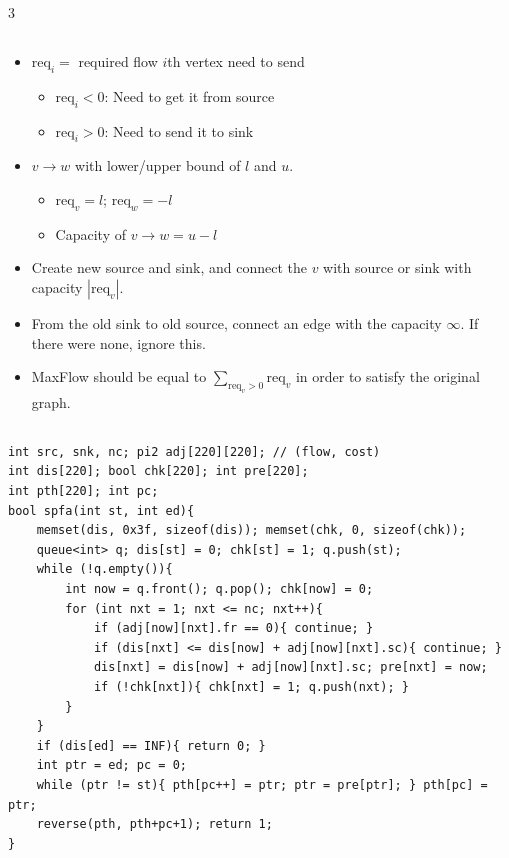 \documentclass[landscape, 8pt, a4paper, oneside]{extarticle}
\begin{document}
\begin{multicols*}{3}
\subsection{}
\begin{itemize}
	\item $\mathrm{req}_i = $ required flow $i$th vertex need to send
	\begin{itemize}
		\item $\mathrm{req}_i < 0$: Need to get it from source
		\item $\mathrm{req}_i > 0$: Need to send it to sink
	\end{itemize}
	\item $v \rightarrow w$ with lower/upper bound of $l$ and $u$.
	\begin{itemize}
		\item $\mathrm{req}_v = l$; $\mathrm{req}_w = -l$
		\item Capacity of $v \rightarrow w = u-l$
	\end{itemize}
	\item Create new source and sink, and connect the $v$ with source or sink with capacity $|\mathrm{req}_v|$.
	\item From the old sink to old source, connect an edge with the capacity $\infty$. If there were none, ignore this.
	\item MaxFlow should be equal to $\sum\limits_{\mathrm{req}_v > 0} \mathrm{req}_v$ in order to satisfy the original graph.
\end{itemize}
\subsection{}
\begin{verbatim}
int src, snk, nc; pi2 adj[220][220]; // (flow, cost)
int dis[220]; bool chk[220]; int pre[220];
int pth[220]; int pc;
bool spfa(int st, int ed){
	memset(dis, 0x3f, sizeof(dis)); memset(chk, 0, sizeof(chk));
	queue<int> q; dis[st] = 0; chk[st] = 1; q.push(st);
	while (!q.empty()){
		int now = q.front(); q.pop(); chk[now] = 0;
		for (int nxt = 1; nxt <= nc; nxt++){
			if (adj[now][nxt].fr == 0){ continue; }
			if (dis[nxt] <= dis[now] + adj[now][nxt].sc){ continue; }
			dis[nxt] = dis[now] + adj[now][nxt].sc; pre[nxt] = now;
			if (!chk[nxt]){ chk[nxt] = 1; q.push(nxt); }
		}
	}
	if (dis[ed] == INF){ return 0; }
	int ptr = ed; pc = 0;
	while (ptr != st){ pth[pc++] = ptr; ptr = pre[ptr]; } pth[pc] = ptr;
	reverse(pth, pth+pc+1); return 1;
}


\end{verbatim}
\end{multicols*}
\end{document}

